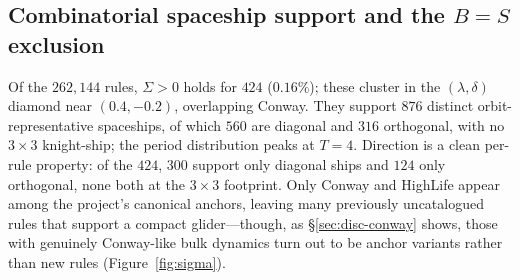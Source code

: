 \documentclass{article}
\begin{document}
\subsection{Combinatorial spaceship support and the $B=S$ exclusion}
\label{sec:results-sigma}

Of the $262{,}144$ rules, $\Sigma>0$ holds for $424$ ($0.16\%$); these cluster in
the $(\lambda,\delta)$ diamond near $(0.4,-0.2)$, overlapping Conway. They support
$876$ distinct orbit-representative spaceships, of which $560$ are diagonal and
$316$ orthogonal, with no $3{\times}3$ knight-ship; the period distribution peaks
at $T=4$. Direction is a clean per-rule property: of the $424$, $300$ support only
diagonal ships and $124$ only orthogonal, none both at the $3{\times}3$ footprint.
Only Conway and HighLife appear among the project's canonical anchors, leaving
many previously uncatalogued rules that support a compact glider---though, as
\S\ref{sec:disc-conway} shows, those with genuinely Conway-like bulk dynamics turn
out to be anchor variants rather than new rules (Figure~\ref{fig:sigma}).
\end{document}
